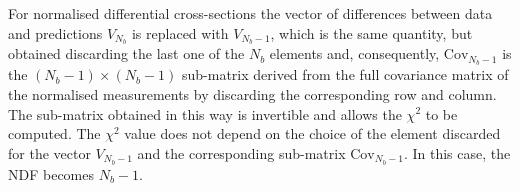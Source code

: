 For normalised differential cross-sections the vector of differences between
data and predictions \( V_{N_b} \) is replaced with \( V_{N_b-1} \),
which is the same quantity, but obtained discarding the last one of
the \( N_b \) elements and, consequently, \( \mathrm{Cov}_{N_b-1} \)
is the \( (N_b-1) \times (N_b-1) \) sub-matrix derived from the full
covariance matrix of the normalised measurements by discarding the
corresponding row and column. The sub-matrix obtained in this way is invertible
and allows the \( \chi^2 \) to be computed. The \( \chi^2 \) value does
not depend on the choice of the element discarded for the vector \( V_{N_b-1} \)
and the corresponding sub-matrix \( \mathrm{Cov}_{N_b-1} \).
In this case, the NDF becomes \( N_b-1 \).


%
%
%
%
%
